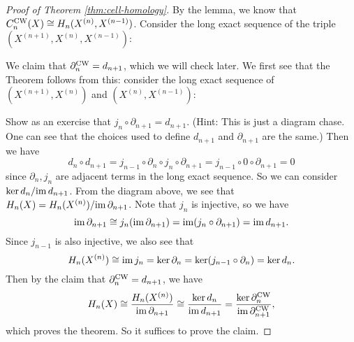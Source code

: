 \begin{proof}[Proof of Theorem \ref{thm:cell-homology}]
  By the lemma, we know that
  $C_n^{\mathrm{CW}}(X) \cong H_n(X^{(n)}, X^{(n - 1)})$.
  Consider the long exact sequence of the
  triple $(X^{(n + 1)}, X^{(n)}, X^{(n - 1)})$:
  \begin{center}
  \end{center}
  We claim that $\partial_n^{\mathrm{CW}} = d_{n + 1}$, which
  we will check later. We first see that the
  Theorem follows from this: consider the
  long exact sequence of $(X^{(n + 1)}, X^{(n)})$
  and $(X^{(n)}, X^{(n - 1)})$:
  \begin{center}
  \end{center}
  Show as an exercise that $j_n \circ \partial_{n + 1} = d_{n + 1}$.
  (Hint: This is just a diagram chase. One can see
  that the choices used to define $d_{n + 1}$ and
  $\partial_{n + 1}$ are the same.)
  Then we have
  \[
    d_n \circ d_{n + 1} = j_{n - 1} \circ \partial_n \circ j_n \circ \partial_{n + 1}
    = j_{n - 1} \circ 0 \circ \partial_{n + 1} = 0
  \]
  since $\partial_n, j_n$ are adjacent terms in
  the long exact sequence.
  So we can consider $\ker d_n / {\operatorname{im} d_{n + 1}}$.
  From the diagram above, we see
  that
  $H_n(X) = H_n(X^{(n)}) / {\operatorname{im} \partial_{n + 1}}$.
  Note that $j_n$ is injective, so we have
  \[
    \operatorname{im} \partial_{n + 1}
    \cong j_n (\operatorname{im} \partial_{n + 1})
    = \operatorname{im} (j_n \circ \partial_{n + 1})
    = \operatorname{im} d_{n + 1}.
  \]
  Since $j_{n - 1}$ is also injective, we also see that
  \[
    H_n(X^{(n)})
    \cong \operatorname{im} j_n = \ker \partial_n
    = \ker (j_{n - 1} \circ \partial_n)
    = \ker d_n.
  \]
  Then by the claim that
  $\partial_n^{\mathrm{CW}} = d_{n + 1}$, we have
  \[
    H_n(X) \cong \frac{H_n(X^{(n)})}{\operatorname{im} \partial_{n + 1}}
    \cong \frac{\ker d_n}{\operatorname{im} d_{n + 1}}
    = \frac{\ker \partial_n^{\mathrm{CW}}}{\operatorname{im} \partial_{n + 1}^{\mathrm{CW}}},
  \]
  which proves the theorem. So it suffices
  to prove the claim.


\end{proof}
